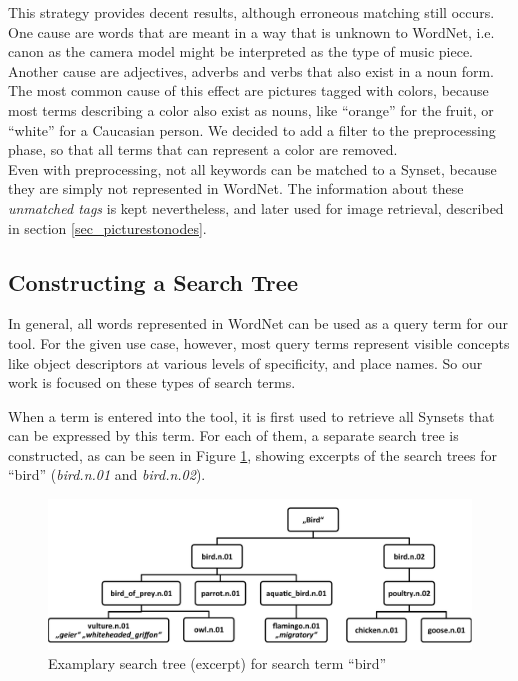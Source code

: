 This strategy provides decent results, although erroneous matching still occurs. One cause are words that are meant in a way that is unknown to WordNet, i.e. canon as the camera model might be interpreted as the type of music piece. Another cause are adjectives, adverbs and verbs that also exist in a noun form. The most common cause of this effect are pictures tagged with colors, because most terms describing a color also exist as nouns, like ``orange'' for the fruit, or ``white'' for a Caucasian person. We decided to add a filter to the preprocessing phase, so that all terms that can represent a color are removed. \\

Even with preprocessing, not all keywords can be matched to a Synset, because they are simply not represented in WordNet. The information about these \emph{unmatched tags} is kept nevertheless, and later used for image retrieval, described in section \ref{sec_picturestonodes}.


\subsection{Constructing a Search Tree}
\label{sec_searchtreeconstruction}
In general, all words represented in WordNet can be used as a query term for our tool. For the given use case, however, most query terms represent visible concepts like object descriptors at various levels of specificity, and place names. So our work is focused on these types of search terms.

When a term is entered into the tool, it is first used to retrieve all Synsets that can be expressed by this term. For each of them, a separate search tree is constructed, as can be seen in Figure \ref{fig_searchtree}, showing excerpts of the search trees for ``bird'' (\emph{bird.n.01} and \emph{bird.n.02}).

\begin{figure}[h]
\includegraphics[width=\textwidth]{images/searchtree.pdf}
\caption{Examplary search tree (excerpt) for search term ``bird''}
\label{fig_searchtree}
\end{figure}

